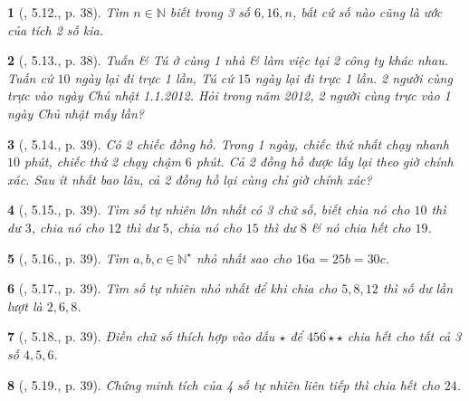 \documentclass{article}
\newtheorem{baitoan}{}
\begin{document}
\begin{baitoan}[\cite{TLCT_THCS_Toan_6_so_hoc}, 5.12., p. 38]
	Tìm $n\in\mathbb{N}$ biết trong 3 số $6,16,n$, bất cứ số nào cũng là ước của tích 2 số kia.
\end{baitoan}

\begin{baitoan}[\cite{TLCT_THCS_Toan_6_so_hoc}, 5.13., p. 38]
	Tuấn \& Tú ở cùng 1 nhà \& làm việc tại 2 công ty khác nhau. Tuấn cứ $10$ ngày lại đi trực 1 lần, Tú cứ $15$ ngày lại đi trực 1 lần. 2 người cùng trực vào ngày Chủ nhật 1.1.2012. Hỏi trong năm 2012, 2 người cùng trực vào 1 ngày Chủ nhật mấy lần?
\end{baitoan}

\begin{baitoan}[\cite{TLCT_THCS_Toan_6_so_hoc}, 5.14., p. 39]
	Có 2 chiếc đồng hồ. Trong 1 ngày, chiếc thứ nhất chạy nhanh $10$ phút, chiếc thứ 2 chạy chậm $6$ phút. Cả 2 đồng hồ được lấy lại theo giờ chính xác. Sau ít nhất bao lâu, cả 2 đồng hồ lại cùng chỉ giờ chính xác?
\end{baitoan}

\begin{baitoan}[\cite{TLCT_THCS_Toan_6_so_hoc}, 5.15., p. 39]
	Tìm số tự nhiên lớn nhất có 3 chữ số, biết chia nó cho $10$ thì dư $3$, chia nó cho $12$ thì dư $5$, chia nó cho $15$ thì dư $8$ \& nó chia hết cho $19$.
\end{baitoan}

\begin{baitoan}[\cite{TLCT_THCS_Toan_6_so_hoc}, 5.16., p. 39]
	Tìm $a,b,c\in\mathbb{N}^\star$ nhỏ nhất sao cho $16a = 25b = 30c$.
\end{baitoan}

\begin{baitoan}[\cite{TLCT_THCS_Toan_6_so_hoc}, 5.17., p. 39]
	Tìm số tự nhiên nhỏ nhất để khi chia cho $5,8,12$ thì số dư lần lượt là $2,6,8$.
\end{baitoan}

\begin{baitoan}[\cite{TLCT_THCS_Toan_6_so_hoc}, 5.18., p. 39]
	Điền chữ số thích hợp vào dấu $\star$ để $\overline{456\star\star}$ chia hết cho tất cả 3 số $4,5,6$.
\end{baitoan}

\begin{baitoan}[\cite{TLCT_THCS_Toan_6_so_hoc}, 5.19., p. 39]
	Chứng minh tích của 4 số tự nhiên liên tiếp thì chia hết cho $24$.
\end{baitoan}
\end{document}
